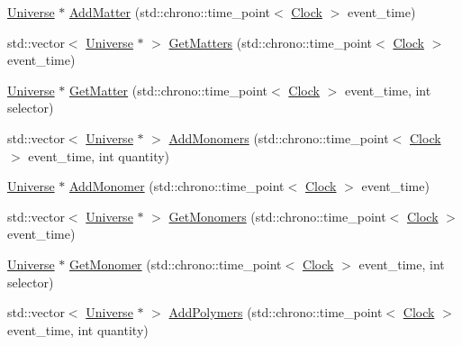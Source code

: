 \begin{DoxyCompactItemize}
\item 
\mbox{\hyperlink{classUniverse}{Universe}} $\ast$ \mbox{\hyperlink{classUniverse_a090d9ad1b88d81364e872e17d65edca4}{Add\+Matter}} (std\+::chrono\+::time\+\_\+point$<$ \mbox{\hyperlink{universe_8h_a0ef8d951d1ca5ab3cfaf7ab4c7a6fd80}{Clock}} $>$ event\+\_\+time)
\item 
std\+::vector$<$ \mbox{\hyperlink{classUniverse}{Universe}} $\ast$ $>$ \mbox{\hyperlink{classUniverse_a4307a62e183fed8cf2b92be0f6014688}{Get\+Matters}} (std\+::chrono\+::time\+\_\+point$<$ \mbox{\hyperlink{universe_8h_a0ef8d951d1ca5ab3cfaf7ab4c7a6fd80}{Clock}} $>$ event\+\_\+time)
\item 
\mbox{\hyperlink{classUniverse}{Universe}} $\ast$ \mbox{\hyperlink{classUniverse_a69de663cf2e32e65ed28c44ae666db3a}{Get\+Matter}} (std\+::chrono\+::time\+\_\+point$<$ \mbox{\hyperlink{universe_8h_a0ef8d951d1ca5ab3cfaf7ab4c7a6fd80}{Clock}} $>$ event\+\_\+time, int selector)
\item 
std\+::vector$<$ \mbox{\hyperlink{classUniverse}{Universe}} $\ast$ $>$ \mbox{\hyperlink{classUniverse_a95fe7f99971bb2048121a7c4e87b9f79}{Add\+Monomers}} (std\+::chrono\+::time\+\_\+point$<$ \mbox{\hyperlink{universe_8h_a0ef8d951d1ca5ab3cfaf7ab4c7a6fd80}{Clock}} $>$ event\+\_\+time, int quantity)
\item 
\mbox{\hyperlink{classUniverse}{Universe}} $\ast$ \mbox{\hyperlink{classUniverse_a062a9472f0400e566ecc7dc056d989d9}{Add\+Monomer}} (std\+::chrono\+::time\+\_\+point$<$ \mbox{\hyperlink{universe_8h_a0ef8d951d1ca5ab3cfaf7ab4c7a6fd80}{Clock}} $>$ event\+\_\+time)
\item 
std\+::vector$<$ \mbox{\hyperlink{classUniverse}{Universe}} $\ast$ $>$ \mbox{\hyperlink{classUniverse_aca82a914e0f8bd7cd1ec80a7220f0a0e}{Get\+Monomers}} (std\+::chrono\+::time\+\_\+point$<$ \mbox{\hyperlink{universe_8h_a0ef8d951d1ca5ab3cfaf7ab4c7a6fd80}{Clock}} $>$ event\+\_\+time)
\item 
\mbox{\hyperlink{classUniverse}{Universe}} $\ast$ \mbox{\hyperlink{classUniverse_aaa03fb8178d790afd992dd094bb64b47}{Get\+Monomer}} (std\+::chrono\+::time\+\_\+point$<$ \mbox{\hyperlink{universe_8h_a0ef8d951d1ca5ab3cfaf7ab4c7a6fd80}{Clock}} $>$ event\+\_\+time, int selector)
\item 
std\+::vector$<$ \mbox{\hyperlink{classUniverse}{Universe}} $\ast$ $>$ \mbox{\hyperlink{classUniverse_aed7cb25507d516a2821ebb69d5345c54}{Add\+Polymers}} (std\+::chrono\+::time\+\_\+point$<$ \mbox{\hyperlink{universe_8h_a0ef8d951d1ca5ab3cfaf7ab4c7a6fd80}{Clock}} $>$ event\+\_\+time, int quantity)

\end{DoxyCompactItemize}
